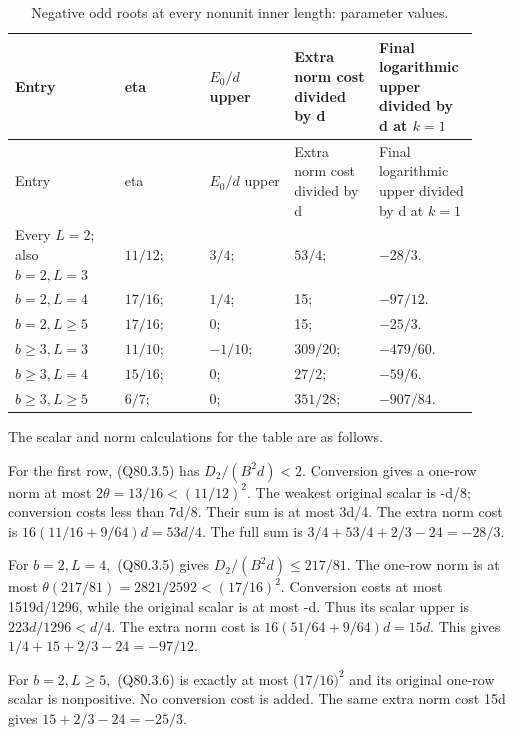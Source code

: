 \begingroup\small
\setlength{\tabcolsep}{3pt}
\setlength{\LTleft}{0pt}\setlength{\LTright}{\fill}
\begin{longtable}{@{}p{0.2200\linewidth}p{0.1750\linewidth}p{0.1750\linewidth}p{0.1750\linewidth}p{0.1750\linewidth}@{}}
\caption{Negative odd roots at every nonunit inner length: parameter values.}\label{tab:parameters:q5-c080:4}\\
\toprule
Entry & eta & \(E_0/d\) upper & Extra norm cost divided by d & Final logarithmic upper divided by d at \(k=1\) \\
\midrule\endfirsthead
\toprule
Entry & eta & \(E_0/d\) upper & Extra norm cost divided by d & Final logarithmic upper divided by d at \(k=1\) \\
\midrule\endhead
\bottomrule\endfoot
Every \(L=2\); also \(b=2,\allowbreak  L=3\) & \(11/12\); & \(3/4\); & \(53/4\); & \(-28/3\). \\
\addlinespace[2pt]
\(b=2,\allowbreak L=4\) & \(17/16\); & \(1/4\); & 15; & \(-97/12\). \\
\addlinespace[2pt]
\(b=2,\allowbreak L\ge 5\) & \(17/16\); & 0; & 15; & \(-25/3\). \\
\addlinespace[2pt]
\(b\ge 3,\allowbreak L=3\) & \(11/10\); & \(-1/10\); & \(309/20\); & \(-479/60\). \\
\addlinespace[2pt]
\(b\ge 3,\allowbreak L=4\) & \(15/16\); & 0; & \(27/2\); & \(-59/6\). \\
\addlinespace[2pt]
\(b\ge 3,\allowbreak L\ge 5\) & \(6/7\); & 0; & \(351/28\); & \(-907/84\). \\
\end{longtable}
\endgroup


The scalar and norm calculations for the table are as follows.

For the first row, (Q80.3.5) has \(D_2/(B^2d)<2.\) Conversion gives a
one-row norm at most \(2\theta=13/16<(11/12)^2.\) The weakest original
scalar is -d/8; conversion costs less than 7d/8. Their sum is
at most 3d/4. The extra norm cost is
\(16(11/16+9/64)d=53d/4.\) The full sum is
\(3/4+53/4+2/3-24=-28/3.\)

For \(b=2,\allowbreak  L=4,\allowbreak \) (Q80.3.5) gives \(D_2/(B^2d)\le 217/81.\) The one-row norm
is at most \(\theta(217/81)=2821/2592<(17/16)^2.\) Conversion costs
at most 1519d/1296, while the original scalar is at most -d.
Thus its scalar upper is \(223d/1296<d/4.\) The extra norm cost is
\(16(51/64+9/64)d=15d.\) This gives \(1/4+15+2/3-24=-97/12.\)

For \(b=2,\allowbreak  L\ge 5,\allowbreak \) (Q80.3.6) is exactly at most (\(17/16)^2\) and its original
one-row scalar is nonpositive. No conversion cost is added.
The same extra norm cost 15d gives \(15+2/3-24=-25/3.\)

